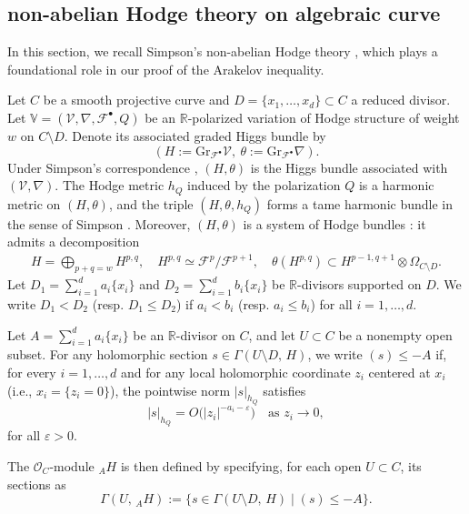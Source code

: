 \documentclass[11pt,letterpaper]{amsart}
\numberwithin{equation}{section}
\begin{document}
\subsection{non-abelian Hodge theory on algebraic curve}\label{section_nonabelian_Hodge}
In this section, we recall Simpson's non-abelian Hodge theory \cite{Simpson1990}, which plays a foundational role in our proof of the Arakelov inequality.

Let $C$ be a smooth projective curve and $D = \{x_1,\dots,x_d\} \subset C$ a reduced divisor. Let $\mathbb{V} = (\mathcal{V}, \nabla, \mathcal{F}^\bullet, Q)$ be an $\mathbb{R}$-polarized variation of Hodge structure of weight $w$ on $C \setminus D$. Denote its associated graded Higgs bundle by  
\[
(H := \mathrm{Gr}_{\mathcal{F}^\bullet}\mathcal{V},\ \theta := \mathrm{Gr}_{\mathcal{F}^\bullet}\nabla).
\]  
Under Simpson’s correspondence \cite{Simpson1988}, $(H,\theta)$ is the Higgs bundle associated with $(\mathcal{V},\nabla)$. The Hodge metric $h_Q$ induced by the polarization $Q$ is a harmonic metric on $(H,\theta)$, and the triple $(H,\theta,h_Q)$ forms a tame harmonic bundle in the sense of Simpson \cite{Simpson1990}. Moreover, $(H,\theta)$ is a system of Hodge bundles \cite[\S 4]{Simpson1992}: it admits a decomposition  
\begin{align*}
	H = \bigoplus_{p+q=w} H^{p,q}, \quad 
	H^{p,q} \simeq \mathcal{F}^p / \mathcal{F}^{p+1}, \quad 
	\theta(H^{p,q}) \subset H^{p-1,q+1} \otimes \Omega_{C \setminus D}.
\end{align*}
Let $D_1 = \sum_{i=1}^d a_i \{x_i\}$ and $D_2 = \sum_{i=1}^d b_i \{x_i\}$ be $\mathbb{R}$-divisors supported on $D$. We write $D_1 < D_2$ (resp. $D_1 \leq D_2$) if $a_i < b_i$ (resp. $a_i \leq b_i$) for all $i = 1,\dots,d$.
\begin{defn}\label{defn_prolongation}
	Let $A = \sum_{i=1}^d a_i \{x_i\}$ be an $\mathbb{R}$-divisor on $C$, and let $U \subset C$ be a nonempty open subset. For any holomorphic section $s \in \Gamma(U \setminus D,\, H)$, we write $(s) \leq -A$ if, for every $i = 1,\dots,d$ and for any local holomorphic coordinate $z_i$ centered at $x_i$ (i.e., $x_i = \{z_i = 0\}$), the pointwise norm $|s|_{h_Q}$ satisfies  
	\[
	|s|_{h_Q} = O\big(|z_i|^{-a_i - \varepsilon}\big) \quad \text{as } z_i \to 0,
	\]  
	for all $\varepsilon > 0$.  
	
	The $\mathcal{O}_C$-module ${}_A H$ is then defined by specifying, for each open $U \subset C$, its sections as  
	\[
	\Gamma(U,\, {}_A H) := \big\{ s \in \Gamma(U \setminus D,\, H) \mid (s) \leq -A \big\}.
	\]
\end{defn}
\end{document}
